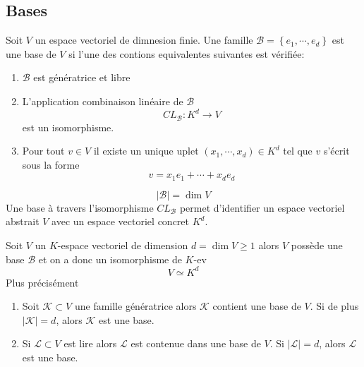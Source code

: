 \documentclass[../main.tex]{subfiles}
\begin{document}
\subsection{Bases}
\begin{defn}
	Soit $V$ un espace vectoriel de dimnesion finie. Une famille $\mathcal{B} = \left\{ e_1, \cdots, e_d \right\} $ est une base de $V$ si l'une des contions equivalentes suivantes est vérifiée:
	\begin{enumerate}
	\item $\mathcal{B}$ est génératrice et libre
	\item L'application combinaison linéaire de $\mathcal{B}$ 
		\[ 
		CL_{\mathcal{B}} : K^{d} \to V
		\]
		est un isomorphisme.
	\item Pour tout $v\in V$ il existe un unique uplet $ ( x_1,\cdots, x_d) \in K^{d}$ tel que $v$ s'écrit sous la forme
		\[ 
		v= x_1e_1 + \cdots + x_d e_d
		\]
		
	\end{enumerate}
	
\end{defn}
\begin{rmq}
\[ 
|\mathcal{B}| = \dim V
\]
Une base à travers l'isomorphisme $CL_{\mathcal{B}} $ permet d'identifier un espace vectoriel abstrait $V$ avec un espace vectoriel concret $K^{d}$.

\end{rmq}
\begin{thm}\label{thm:isom_de_Kd_vers_V}
Soit $V$ un $K$-espace vectoriel de dimension $d = \dim V \geq 1$ alors $V$ possède une base $\mathcal{B}$ et on a donc un isomorphisme de $K$-ev
\[ 
V \simeq K ^{d}
\]
Plus précisément
\begin{enumerate}
\item Soit $ \mathcal{K} \subset V$  une famille génératrice alors $\mathcal{K}$ contient une base de $V$. Si de plus $ |\mathcal{K}| =d$, alors $ \mathcal{K}$ est une base.
\item Si $\mathcal{L}\subset V$ est lire alors $\mathcal{L}$ est contenue dans une base de $V$. Si $| \mathcal{L}| =d$, alors $\mathcal{L}$ est une base.
\end{enumerate}

\end{thm}
\end{document}
